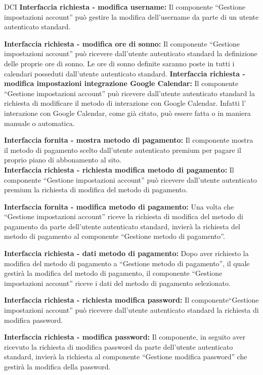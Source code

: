 \begin{listaPersonale}{DCI}
    \textbf{Interfaccia richiesta - modifica username:} Il componente “Gestione impostazioni account” può gestire la modifica dell'username da parte di un utente autenticato standard.

    \textbf{Interfaccia richiesta - modifica ore di sonno:} Il componente “Gestione impostazioni account” può ricevere dall'utente autenticato standard la definizione delle proprie ore di sonno. Le ore di sonno definite saranno poste in tutti i calendari posseduti dall'utente autenticato standard.
    \textbf{Interfaccia richiesta - modifica impostazioni integrazione
        Google Calendar:} Il componente “Gestione impostazioni account” può ricevere dall'utente autenticato standard la richiesta di modificare il metodo di interazione con Google Calendar. Infatti l' interazione con Google Calendar, come già citato, può essere fatta o in maniera manuale o automatica.

    \textbf{Interfaccia fornita - mostra metodo di pagamento:} Il componente mostra il metodo di pagamento scelto dall'utente autenticato premium per pagare il proprio piano di abbonamento al sito. \\
    \textbf{Interfaccia richiesta - richiesta modifica metodo di
        pagamento:} Il componente “Gestione impostazioni account” può ricevere dall'utente autenticato premium la richiesta di modifica del metodo di pagamento.

    \textbf{Interfaccia fornita - modifica metodo di pagamento:} Una volta che “Gestione impostazioni account” riceve la richiesta di modifica del metodo di pagamento da parte dell'utente autenticato standard, invierà la richiesta del metodo di pagamento al componente “Gestione metodo di pagamento”.

    \textbf{Interfaccia richiesta - dati metodo di pagamento:} Dopo aver richiesto la modifica del metodo di pagamento a “Gestione metodo di pagamento”, il quale gestirà la modifica del metodo di pagamento, il componente “Gestione impostazioni account” riceve i dati del metodo di pagamento selezionato.

    \textbf{Interfaccia richiesta - richiesta modifica password:} Il componente“Gestione impostazioni account” può ricevere dall'utente autenticato standard la richiesta di modifica password.

    \textbf{Interfaccia richiesta - modifica password:} Il componente, in seguito aver ricevuto la richiesta di modifica password da parte dell'utente autenticato standard, invierà la richiesta al componente “Gestione modifica password” che gestirà la modifica della password.


\end{listaPersonale}
